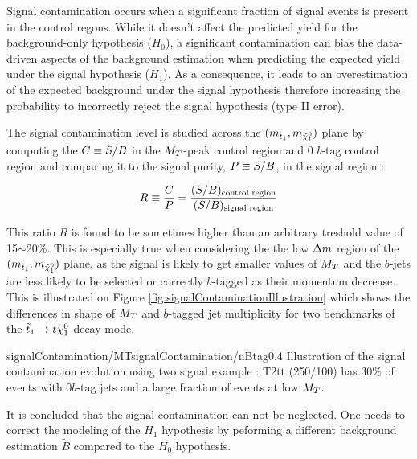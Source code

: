         Signal contamination occurs when a significant fraction of signal events is present in
        the control regons. While it doesn't affect the predicted yield for the background-only hypothesis
        ($H_0$), a significant contamination can bias the data-driven aspects of the background
        estimation when predicting the expected yield under the signal hypothesis ($H_1$). As a
        consequence, it leads to an overestimation of the expected background under the signal hypothesis
        therefore increasing the probability to incorrectly reject the signal hypothesis (type II error).

        The signal contamination level is studied across the $(m_{\tilde{t}_1},m_{\tilde{\chi}_1^0})$
        plane by computing the $C \equiv S/B$ in the $M_T$-peak control region and 0 $b$-tag
        control region and comparing it to the signal purity, $P \equiv S/B$, in the signal region :

        \begin{equation}
            R \equiv \frac{C}{P} = \frac{(S/B)_\text{control region}}{(S/B)_\text{signal region}}
            \label{eq:contaminationRatio}
        \end{equation}

        This ratio $R$ is found to be sometimes higher than an arbitrary treshold value of 15$\sim$20\%.
        This is especially true when considering the the low $\Delta m$ region of the $(m_{\tilde{t}_1},
        m_{\tilde{\chi}_1^0})$ plane, as the signal is likely to get smaller values of $M_T$ and the $b$-jets
        are less likely to be selected or correctly $b$-tagged as their momentum decrease. This is illustrated
        on Figure \ref{fig:signalContaminationIllustration} which shows the differences in shape of $M_T$ and
        $b$-tagged jet multiplicity for two benchmarks of the $\tilde{t}_1 \rightarrow t \tilde{\chi}_1^0$ decay mode.

                         {signalContamination/MT}{signalContamination/nBtag}{0.4}
                         {Illustration of the signal contamination evolution using two signal example :
                         T2tt (250/100) has 30\% of events with 0$b$-tag jets and a large fraction of events at low $M_T$.}

        It is concluded that the signal contamination can not be neglected. One needs to correct the modeling
        of the $H_1$ hypothesis by peforming a different background estimation $\tilde{B}$ compared to the
        $H_0$ hypothesis.

